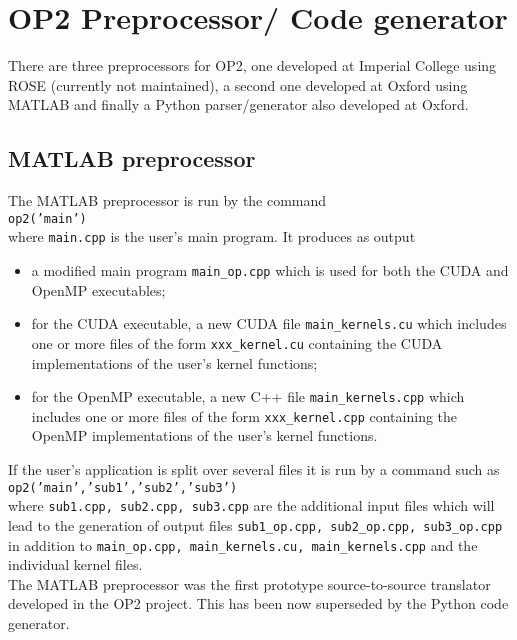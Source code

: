 \documentclass[11pt]{article}
\begin{document}
\newpage

\section{OP2 Preprocessor/ Code generator}

There are three preprocessors for OP2, one developed at Imperial College using ROSE (currently not maintained),
a second one developed at Oxford using MATLAB and finally a Python parser/generator also developed at Oxford.

\subsection{MATLAB preprocessor}
The MATLAB preprocessor is run by the command\\

{\tt op2('main')}\\

\noindent
where {\tt main.cpp} is the user's main program.  It produces as output
\begin{itemize}
\item
a modified main program {\tt main\_op.cpp} which is used for both the
CUDA and OpenMP executables;
\item
for the CUDA executable, a new CUDA file {\tt main\_kernels.cu} which
includes one or more files of the form {\tt xxx\_kernel.cu} containing
the CUDA implementations of the user's kernel functions;
\item
for the OpenMP executable, a new C++ file {\tt main\_kernels.cpp} which
includes one or more files of the form {\tt xxx\_kernel.cpp} containing
the OpenMP implementations of the user's kernel functions.
\end{itemize}

\noindent
If the user's application is split over several files it is run by a command such as\\

{\tt op2('main','sub1','sub2','sub3')}\\

\noindent
where {\tt sub1.cpp, sub2.cpp, sub3.cpp} are the additional input files which will
lead to the generation of output files {\tt sub1\_op.cpp, sub2\_op.cpp, sub3\_op.cpp}
in addition to {\tt main\_op.cpp, main\_kernels.cu, main\_kernels.cpp}
and the individual kernel files.\\

\noindent
The MATLAB preprocessor was the first prototype source-to-source translator developed in the OP2 project. This has been
now superseded by the Python code generator.
\end{document}
